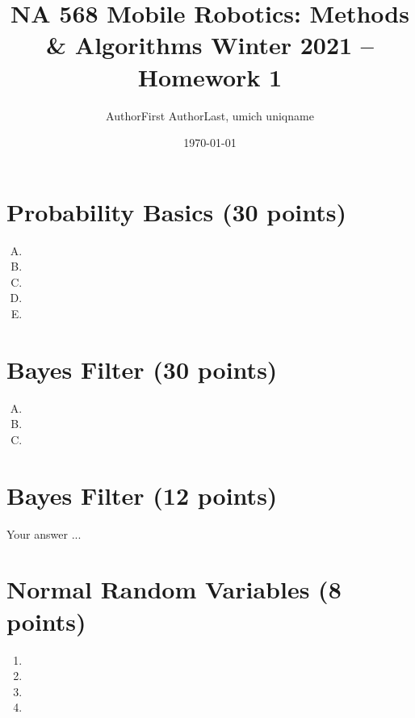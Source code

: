 \documentclass[11pt, oneside, letter]{article}
\begin{document}
\title{\huge\textbf{NA 568 Mobile Robotics: Methods \& Algorithms Winter 2021 -- Homework 1}}
\author{AuthorFirst AuthorLast, umich uniqname}
\date{\today}
\maketitle


\section{Probability Basics (30 points)}
\begin{enumerate}[A.]
\item 

\item 

\item 

\item 
    
\item 
    
\end{enumerate}


\section{Bayes Filter (30 points)}

\begin{enumerate}[A.]

\item 

\item 

\item 

\end{enumerate}



\section{Bayes Filter (12 points)} 

Your answer ...

\section{Normal Random Variables (8 points)}

\begin{enumerate}
\item 
\item 
\item  
\item 
\end{enumerate}
\end{document}
